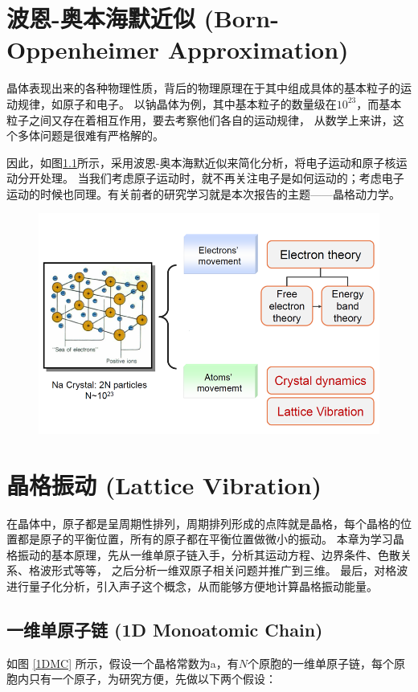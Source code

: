 \documentclass[declarePage]{ecnuthesis}
\begin{document}
\chapter{波恩-奥本海默近似 (Born-Oppenheimer Approximation)}

晶体表现出来的各种物理性质，背后的物理原理在于其中组成具体的基本粒子的运动规律，如原子和电子。%
以钠晶体为例，其中基本粒子的数量级在$10^{23}$，而基本粒子之间又存在着相互作用，要去考察他们各自的运动规律，%
从数学上来讲，这个多体问题是很难有严格解的。\cite{main}

因此，如图\ref{BOA}所示，采用波恩-奥本海默近似来简化分析，将电子运动和原子核运动分开处理。%
当我们考虑原子运动时，就不再关注电子是如何运动的；考虑电子运动的时候也同理。有关前者的研究学习就是本次报告的主题——晶格动力学。
\begin{figure}[htb]
    \centering
    \includegraphics[width=.7\textwidth]{BOA.png}
    \label{BOA}
\end{figure}

\chapter{晶格振动 (Lattice Vibration)}

在晶体中，原子都是呈周期性排列，周期排列形成的点阵就是晶格，每个晶格的位置都是原子的平衡位置，所有的原子都在平衡位置做微小的振动。%
本章为学习晶格振动的基本原理，先从一维单原子链入手，分析其运动方程、边界条件、色散关系、格波形式等等，%
之后分析一维双原子相关问题并推广到三维。%
最后，对格波进行量子化分析，引入声子这个概念，从而能够方便地计算晶格振动能量。

\section{一维单原子链 (1D Monoatomic Chain)}

如图 \ref{1DMC} 所示，假设一个晶格常数为a，有$N$个原胞的一维单原子链，每个原胞内只有一个原子，为研究方便，先做以下两个假设：\cite{1DC}
\end{document}
